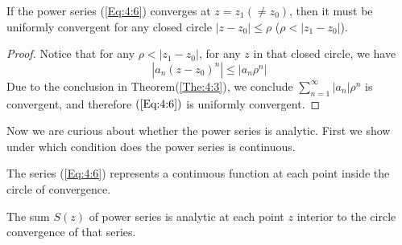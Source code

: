 \begin{theorem}
If the power series (\ref{Eq:4:6}) converges at $z=z_1(\ne z_0)$, then it must be uniformly convergent for any closed circle $|z-z_0|\le \rho$ ($\rho<|z_1-z_0|$).
\end{theorem}
\begin{proof}
Notice that for any $\rho<|z_1-z_0|$, for any $z$ in that closed circle, we have
\[
|a_n(z-z_0)^n|\le |a_n\rho^n|
\]
Due to the conclusion in Theorem(\ref{The:4:3}), we conclude $\sum_{n=1}^\infty |a_n|\rho^n$ is convergent, and therefore $(\ref{Eq:4:6})$ is uniformly convergent.

\end{proof}
Now we are curious about whether the power series is analytic. First we show under which condition does the power series is continuous.
\begin{theorem}
The series (\ref{Eq:4:6}) represents a continuous function at each point inside the circle of convergence.
\end{theorem}

\begin{theorem}
The sum $S(z)$ of power series is analytic at each point $z$ interior to the circle convergence of that series.
\end{theorem}






















